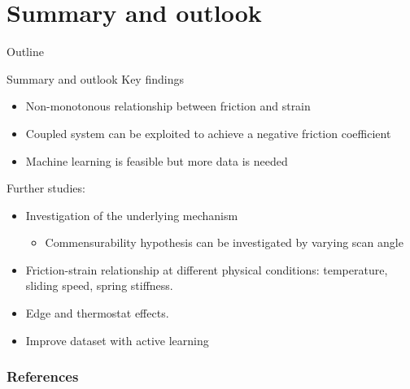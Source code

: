 \documentclass[
	10pt, %
]{beamer}
\begin{document}
\section{Summary and outlook} %
\begin{frame}{Outline}
    \tableofcontents[currentsection]
\end{frame}


\begin{frame}{Summary and outlook}
	Key findings
	\begin{itemize}
		\item Non-monotonous relationship between friction and strain
		\item Coupled system can be exploited to achieve a negative friction coefficient
		\item Machine learning is feasible but more data is needed
	\end{itemize}
	Further studies:
	\begin{itemize}
		\item Investigation of the underlying mechanism
		\begin{itemize}
			\item Commensurability hypothesis can be investigated by varying scan angle
		\end{itemize}
		\item Friction-strain relationship at different physical conditions: temperature, sliding speed, spring stiffness. 
		\item Edge and thermostat effects.
		\item Improve dataset with active learning 
	\end{itemize}
\end{frame}






\begin{frame}[allowframebreaks]
	\frametitle{References}
	\printbibliography
\end{frame}
\end{document}
